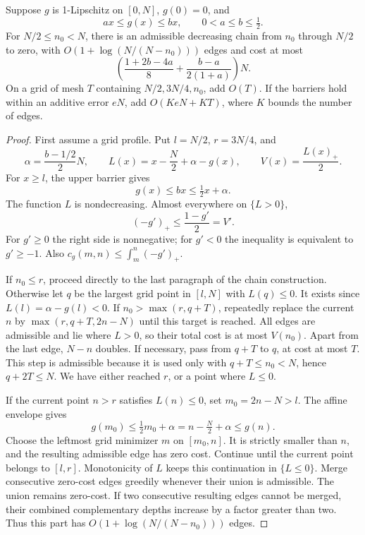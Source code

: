 \begin{lemma}\label{fprof:affine}
Suppose \(g\) is 1-Lipschitz on \([0,N]\), \(g(0)=0\), and
$$
 ax\le g(x)\le bx,\qquad 0<a\le b\le\tfrac12.
$$
For \(N/2\le n_0<N\), there is an admissible decreasing chain from \(n_0\) through
\(N/2\) to zero, with \(O(1+\log(N/(N-n_0)))\) edges and cost at most
\begin{equation}\label{fprof:affinecost}
 \left(\frac{1+2b-4a}{8}+\frac{b-a}{2(1+a)}\right)N.
\end{equation}
On a grid of mesh \(T\) containing \(N/2,3N/4,n_0\), add \(O(T)\).
If the barriers hold within an additive error \(eN\), add \(O(KeN+KT)\),
where \(K\) bounds the number of edges.
\end{lemma}
\begin{proof}
First assume a grid profile. Put \(l=N/2\), \(r=3N/4\), and
$$
 \alpha=\frac{b-1/2}{2}N,\qquad
 L(x)=x-\frac N2+\alpha-g(x),\qquad V(x)=\frac{L(x)_+}{2}.
$$
For \(x\ge l\), the upper barrier gives
$$
 g(x)\le bx\le \tfrac12x+\alpha.
$$
The function \(L\) is nondecreasing. Almost everywhere on \(\{L>0\}\),
$$
 (-g')_+\le\frac{1-g'}2=V'.
$$
For \(g'\ge0\) the right side is nonnegative; for \(g'<0\) the inequality
is equivalent to \(g'\ge-1\). Also \(c_g(m,n)\le\int_m^n(-g')_+\).

If \(n_0\le r\), proceed directly to the last paragraph of the chain construction.
Otherwise let \(q\) be the largest grid point in \([l,N]\) with \(L(q)\le0\).
It exists since \(L(l)=\alpha-g(l)<0\). If \(n_0>\max(r,q+T)\), repeatedly
replace the current \(n\) by \(\max(r,q+T,2n-N)\) until this target is reached.
All edges are admissible and lie where \(L>0\), so their total cost is at most
\(V(n_0)\). Apart from the last edge, \(N-n\) doubles.
If necessary, pass from \(q+T\) to \(q\), at cost at most \(T\).
This step is admissible because it is used only with \(q+T\le n_0<N\), hence
\(q+2T\le N\). We have either reached \(r\), or a point where \(L\le0\).

If the current point \(n>r\) satisfies \(L(n)\le0\), set \(m_0=2n-N>l\).
The affine envelope gives
$$
 g(m_0)\le\tfrac12m_0+\alpha
 =n-\tfrac N2+\alpha\le g(n).
$$
Choose the leftmost grid minimizer \(m\) on \([m_0,n]\).
It is strictly smaller than \(n\), and the resulting admissible edge has zero cost.
Continue until the current point belongs to \([l,r]\).
Monotonicity of \(L\) keeps this continuation in \(\{L\le0\}\).
Merge consecutive zero-cost edges greedily whenever their union is admissible.
The union remains zero-cost. If two consecutive resulting edges cannot be merged,
their combined complementary depths increase by a factor greater than two.
Thus this part has \(O(1+\log(N/(N-n_0)))\) edges.


\end{proof}
